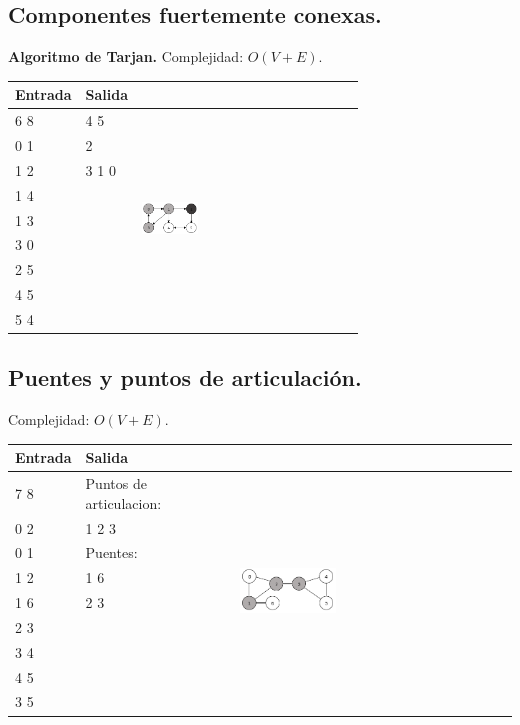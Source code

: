 \documentclass[10pt, letterpaper, twoside]{article}
\begin{document}
\subsection{Componentes fuertemente conexas.}

\textbf{Algoritmo de Tarjan.} Complejidad: $O(V + E)$.



\begin{tabular}{|p{4cm}|p{4cm}|p{7.5cm}|}
\hline
\textbf{Entrada} & \textbf{Salida} & \\ \hline
6 8 & 4 5 & \multirow{9}{*}{\includegraphics[width = 0.27\textwidth]{Grafos/Imagenes/StronglyConnected.png}} \\
0 1 & 2 & \\
1 2 & 3 1 0 & \\
1 4 & & \\ 
1 3 & & \\
3 0 & & \\
2 5 & & \\
4 5 & & \\
5 4 & & \\ \hline
\end{tabular}

\subsection{Puentes y puntos de articulación.}

Complejidad: $O(V + E)$.



\begin{tabular}{|p{4cm}|p{4cm}|p{7.5cm}|}
\hline
\textbf{Entrada} & \textbf{Salida} & \\ \hline
7 8 & Puntos de articulacion: & \multirow{9}{*}{\includegraphics[width = 0.36\textwidth]{Grafos/Imagenes/Bridge-Articulation.png}} \\
0 2 & 1 2 3 & \\
0 1 & Puentes: &\\
1 2 & 1 6 & \\ 
1 6 & 2 3 & \\
2 3 & & \\
3 4 & & \\
4 5 & & \\
3 5 & & \\ \hline
\end{tabular}
\end{document}
